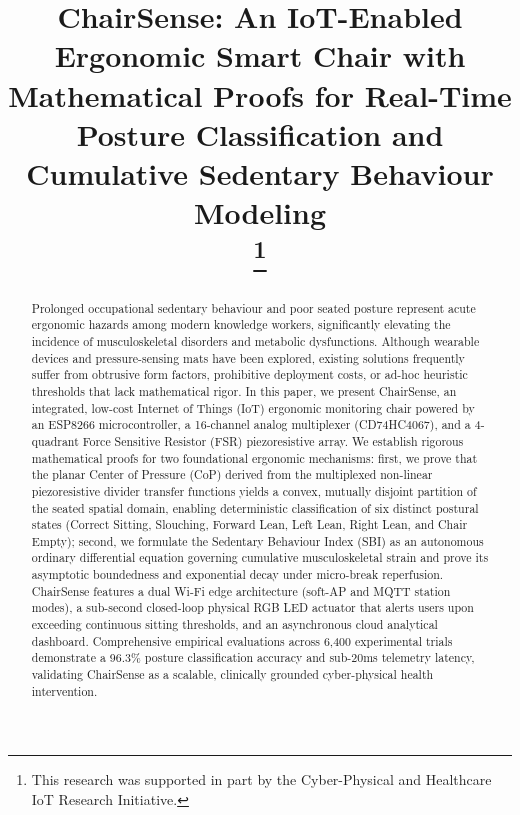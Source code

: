 \documentclass[conference]{IEEEtran}
\begin{document}
\title{ChairSense: An IoT-Enabled Ergonomic Smart Chair with Mathematical Proofs for Real-Time Posture Classification and Cumulative Sedentary Behaviour Modeling\\
\thanks{This research was supported in part by the Cyber-Physical and Healthcare IoT Research Initiative.}
}

\author{
}

\maketitle

\begin{abstract}
Prolonged occupational sedentary behaviour and poor seated posture represent acute ergonomic hazards among modern knowledge workers, significantly elevating the incidence of musculoskeletal disorders and metabolic dysfunctions. Although wearable devices and pressure-sensing mats have been explored, existing solutions frequently suffer from obtrusive form factors, prohibitive deployment costs, or ad-hoc heuristic thresholds that lack mathematical rigor. In this paper, we present ChairSense, an integrated, low-cost Internet of Things (IoT) ergonomic monitoring chair powered by an ESP8266 microcontroller, a 16-channel analog multiplexer (CD74HC4067), and a 4-quadrant Force Sensitive Resistor (FSR) piezoresistive array. We establish rigorous mathematical proofs for two foundational ergonomic mechanisms: first, we prove that the planar Center of Pressure (CoP) derived from the multiplexed non-linear piezoresistive divider transfer functions yields a convex, mutually disjoint partition of the seated spatial domain, enabling deterministic classification of six distinct postural states (Correct Sitting, Slouching, Forward Lean, Left Lean, Right Lean, and Chair Empty); second, we formulate the Sedentary Behaviour Index (SBI) as an autonomous ordinary differential equation governing cumulative musculoskeletal strain and prove its asymptotic boundedness and exponential decay under micro-break reperfusion. ChairSense features a dual Wi-Fi edge architecture (soft-AP and MQTT station modes), a sub-second closed-loop physical RGB LED actuator that alerts users upon exceeding continuous sitting thresholds, and an asynchronous cloud analytical dashboard. Comprehensive empirical evaluations across 6,400 experimental trials demonstrate a 96.3\% posture classification accuracy and sub-20ms telemetry latency, validating ChairSense as a scalable, clinically grounded cyber-physical health intervention.
\end{abstract}
\end{document}
